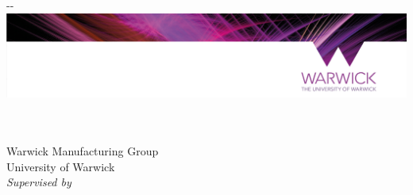 \makeatletter
\begin{titlepage}

    \vspace*{-1.45in}

    \begin{adjustwidth}{-\oddsidemargin-1in}{-\rightmargin}
        \centering
        \hspace*{-1mm}
        \includegraphics[width=\paperwidth]{aux/head.jpeg}
    \end{adjustwidth}

    \vspace*{1.5in}

    \textbf{\Huge \@title} \\ [2cm]

    \Large \textbf{\@author} \\ [1cm]
    Warwick Manufacturing Group \\
    University of Warwick \\

    \emph{Supervised by \@supervisor} \\

    \vfill

\end{titlepage}
\makeatother
